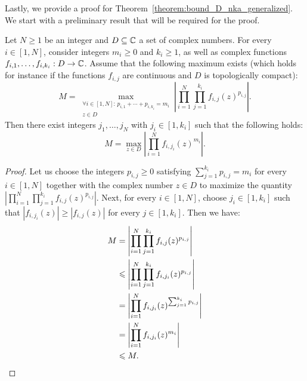 \documentclass{llncs}
\begin{document}
Lastly, we provide a proof for Theorem~\ref{theorem:bound_D_nka_generalized}.
We start with a preliminary result that will be required for the proof.

\begin{lemma}\label{lemma:maximizing_args}
    Let $N\geq 1$ be an integer and $D\subseteq\C$ a set of complex numbers. For every $i\in[1,N]$, consider integers $m_i\geq 0$ and $k_i\geq 1$, as well as complex functions $f_{i,1},\dots,f_{i,k_i}:D\to\C$. Assume that the following maximum exists (which holds for instance if the functions $f_{i,j}$ are continuous and $D$ is topologically compact):
    \[
        M=\max_{\substack{\forall i\in[1,N]:\,p_{i,1}+\cdots+p_{i,k_i}=m_i\\z\in D}}\left|\prod_{i=1}^N\prod_{j=1}^{k_i}f_{i,j}(z)^{p_{i,j}}\right|.
    \]
    Then there exist integers $j_1,\dots,j_N$ with $j_i\in[1,k_i]$ such that the following holds:
    \[
        M=\max_{z\in D}\left|\prod_{i=1}^Nf_{i,j_i}(z)^{m_i}\right|.
    \]
\end{lemma}

\begin{proof}
    Let us choose the integers $p_{i,j}\geq 0$ satisfying $\sum_{j=1}^{k_i}p_{i,j}=m_i$ for every $i\in[1,N]$ together with the complex number $z\in D$ to maximize the quantity $\left|\prod_{i=1}^N\prod_{j=1}^{k_i}f_{i,j}(z)^{p_{i,j}}\right|$. Next, for every $i\in[1,N]$, choose $j_i\in[1,k_i]$ such that $|f_{i,j_i}(z)|\geq|f_{i,j}(z)|$ for every $j\in[1,k_i]$. Then we have:
    \begin{align*}
        M&=\left|\prod_{i=1}^N\prod_{j=1}^{k_i}f_{i,j}(z)^{p_{i,j}}\right|\\
		&\leq\left|\prod_{i=1}^N\prod_{j=1}^{k_i}f_{i,j_i}(z)^{p_{i,j}}\right|\\
		&=\left|\prod_{i=1}^Nf_{i,j_i}(z)^{\sum_{j=1}^{k_i}p_{i,j}}\right|\\
		&=\left|\prod_{i=1}^Nf_{i,j_i}(z)^{m_i}\right|\\
		&\leq M.\qedhere
    \end{align*}
\end{proof}
\end{document}
